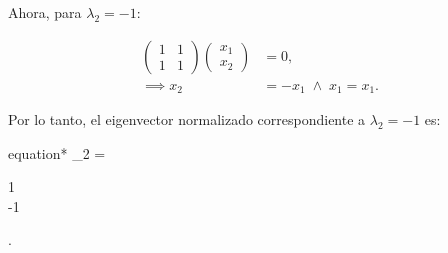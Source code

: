 \documentclass[./../main.tex]{subfiles}
\begin{document}
\begin{problema}
	Ahora, para \(\lambda_{2} = -1\):

	\begin{align*}
		\begin{pmatrix}
			1 & 1 \\
			1 & 1
		\end{pmatrix} \begin{pmatrix}
			              x_{1} \\
			              x_{2}
		              \end{pmatrix} & = 0,                                 \\
		\implies x_{2}                & = -x_{1}\; \wedge\; x_{1} = x_{1}.
	\end{align*}

	Por lo tanto, el eigenvector normalizado correspondiente a \(\lambda_{2} = -1\) es:

	\begin{empheq}[box=\resultbox]{equation*}
		_{2} = \begin{pmatrix}
			1 \\
			-1
		\end{pmatrix}.
	\end{empheq}
\end{problema}
\end{document}
